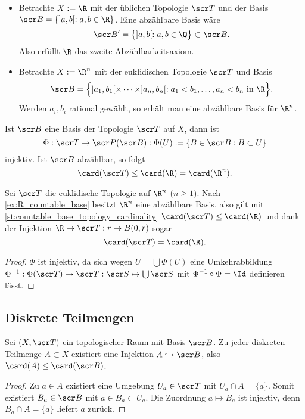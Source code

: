 \begin{ex} \label{ex:R_countable_base}
	\begin{itemize}
		\item
			Betrachte $X := \R$ mit der üblichen Topologie $\scr T$ und der Basis $\scr B = \{ ]a,b[ : a,b \in \R \}$.
			Eine abzählbare Basis wäre
			\[
				\scr B' = \big\{ ]a,b[ : a,b \in \Q \big\} \subset \scr B.
			\]
			Also erfüllt $\R$ das zweite Abzählbarkeitsaxiom.
		\item
			Betrachte $X := \R^n$ mit der euklidischen Topologie $\scr T$ und Basis
			\[
				\scr B = \Big\{ ]a_1,b_1[ \times \dotsb \times ]a_n,b_n[ : a_1 < b_1, \dotsc, a_n < b_n \text{ in $\R$} \Big\}.
			\]
			Werden $a_i, b_i$ rational gewählt, so erhält man eine abzählbare Basis für $\R^n$.
	\end{itemize}
\end{ex}

\begin{st} \label{st:countable_base_topology_cardinality}
	Ist $\scr B$ eine Basis der Topologie $\scr T$ auf $X$, dann ist
	\[
		\Phi
		: \scr T \to \scr P (\scr B)
		: \Phi(U) := \{ B \in \scr B : B \subset U \}
	\]
	injektiv.
	Ist $\scr B$ abzählbar, so folgt
	\[
		\card(\scr T)
		\le \card(\R) = \card(\R^n).
	\]
	\begin{note}
		Sei $\scr T$ die euklidische Topologie auf $\R^n$ ($n\ge 1$).
		Nach \ref{ex:R_countable_base} besitzt $\R^n$ eine abzählbare Basis, also gilt mit \ref{st:countable_base_topology_cardinality} $\card(\scr T) \le \card(\R)$ und dank der Injektion $\R \to \scr T : r \mapsto B(0,r)$ sogar
		\[
			\card(\scr T) = \card(\R).
		\]
	\end{note}
	\begin{proof}
		$\Phi$ ist injektiv, da sich wegen $U = \bigcup \Phi(U)$ eine Umkehrabbildung $\Phi^{-1}: \Phi(\scr T) \to \scr T:  \scr S \mapsto \bigcup \scr S$ mit $\Phi^{-1} \circ \Phi = \Id$ definieren lässt.
	\end{proof}
\end{st}

\subsection{Diskrete Teilmengen}

\begin{lem} \label{st:discrete_subset_cardinality}
	Sei $(X, \scr T)$ ein topologischer Raum mit Basis $\scr B$.
	Zu jeder diskreten Teilmenge $A \subset X$ existiert eine Injektion $A \injto \scr B$, also $\card (A) \le \card(\scr B)$.
	\begin{proof}
		Zu $a \in A$ existiert eine Umgebung $U_a \in \scr T$ mit $U_a \cap A = \{a\}$.
		Somit existiert $B_a \in \scr B$ mit $a \in B_a \subset U_a$.
		Die Zuordnung $a \mapsto B_a$ ist injektiv, denn $B_a \cap A = \{a\}$ liefert $a$ zurück.
	\end{proof}
\end{lem}

